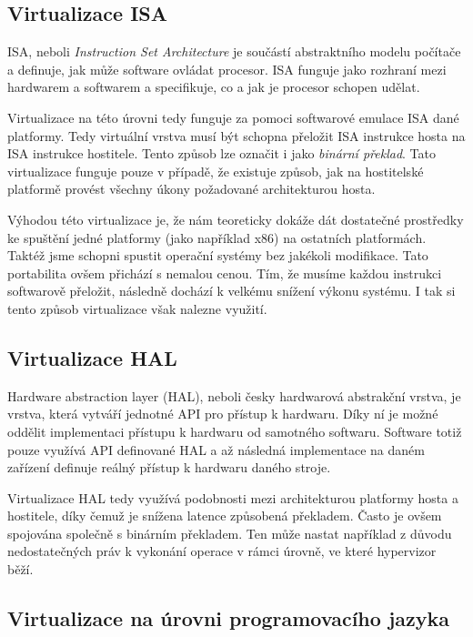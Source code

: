 \subsection{Virtualizace ISA}

ISA, neboli \textit{Instruction Set Architecture} je součástí abstraktního modelu počítače a definuje, jak může software ovládat procesor. ISA funguje jako rozhraní mezi hardwarem a softwarem a specifikuje, co a jak je procesor schopen udělat.\,\cite{isa-arm}

Virtualizace na této úrovni tedy funguje za pomoci softwarové emulace ISA dané platformy. Tedy virtuální vrstva musí být schopna přeložit ISA instrukce hosta na ISA instrukce hostitele. Tento způsob lze označit i jako \textit{binární překlad}. Tato virtualizace funguje pouze v případě, že existuje způsob, jak na hostitelské platformě provést všechny úkony požadované architekturou hosta.\,\cite{chiueh2005survey}

Výhodou této virtualizace je, že nám teoreticky dokáže dát dostatečné prostředky ke spuštění jedné platformy (jako například x86) na ostatních platformách. Taktéž jsme schopni spustit operační systémy bez jakékoli modifikace. Tato portabilita ovšem přichází s nemalou cenou. Tím, že musíme každou instrukci softwarově přeložit, následně dochází k velkému snížení výkonu systému. I tak si tento způsob virtualizace však nalezne využití.\,\cite{chiueh2005survey}\cite{RODRIGUEZHARO2012267}


\subsection{Virtualizace HAL}

Hardware abstraction layer (HAL), neboli česky hardwarová abstrakční vrstva, je vrstva, která vytváří jednotné API pro přístup k hardwaru. Díky ní je možné oddělit implementaci přístupu k hardwaru od samotného softwaru. Software totiž pouze využívá API definované HAL a až následná implementace na daném zařízení definuje reálný přístup k hardwaru daného stroje.\,\cite{haldef}

Virtualizace HAL tedy využívá podobnosti mezi architekturou platformy hosta a hostitele, díky čemuž je snížena latence způsobená překladem. Často je ovšem spojována společně s binárním překladem. Ten může nastat například z důvodu nedostatečných práv k vykonání operace v rámci úrovně, ve které hypervizor běží.\,\cite{chiueh2005survey}\cite{vcc_2}


\subsection{Virtualizace na úrovni programovacího jazyka}

